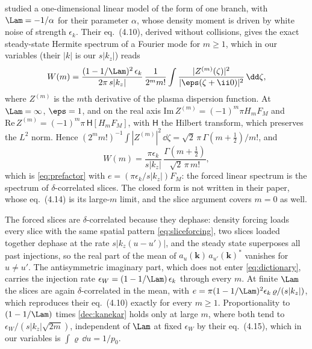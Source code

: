 \citet{Kanekar2015} studied a one-dimensional linear model of the form of one branch, with $\Lam=-1/\alpha$ for their parameter $\alpha$, whose density moment is driven by white noise of strength $\epsilon_k$. Their eq.~(4.10), derived without collisions, gives the exact steady-state Hermite spectrum of a Fourier mode for $m\ge1$, which in our variables (their $|k|$ is our $s|k_z|$) reads
\begin{equation*}
  W(m)=\frac{(1-1/\Lam)^2\,\epsilon_k}{2\pi\,s|k_z|}\,\frac{1}{2^mm!}\int\frac{|Z^{(m)}(\zeta)|^2}{|\eps(\zeta+\ii0)|^2}\,\dd\zeta ,
\end{equation*}
where $Z^{(m)}$ is the $m$th derivative of the plasma dispersion function. At $\Lam=\infty$, $\eps=1$, and on the real axis $\mathrm{Im}\,Z^{(m)}=(-1)^m\pi H_mF_M$ and $\mathrm{Re}\,Z^{(m)}=(-1)^m\pi\,\mathsf H[H_mF_M]$, with $\mathsf H$ the Hilbert transform, which preserves the $L^2$ norm. Hence $(2^mm!)^{-1}\int|Z^{(m)}|^2\,\dd\zeta=\sqrt2\,\pi\,\Gamma(m+\frac12)/m!$, and
\begin{equation}\label{dec:kanekar}
  W(m)=\frac{\pi\epsilon_k}{s|k_z|}\,\frac{\Gamma(m+\frac12)}{\sqrt2\,\pi\,m!} ,
\end{equation}
which is \eqref{eq:prefactor} with $e=(\pi\epsilon_k/s|k_z|)F_M$: the forced linear spectrum is the spectrum of $\delta$-correlated slices. The closed form is not written in their paper, whose eq.~(4.14) is its large-$m$ limit, and the slice argument covers $m=0$ as well.

The forced slices are $\delta$-correlated because they dephase: density forcing loads every slice with the same spatial pattern \eqref{eq:sliceforcing}, two slices loaded together dephase at the rate $s|k_z(u-u')|$, and the steady state superposes all past injections, so the real part of the mean of $a_u(\boldsymbol k)\,a_{u'}(\boldsymbol k)^*$ vanishes for $u\ne u'$. The antisymmetric imaginary part, which does not enter \eqref{eq:dictionary}, carries the injection rate $\epsilon_W=(1-1/\Lam)\,\epsilon_k$ through every $m$. At finite $\Lam$ the slices are again $\delta$-correlated in the mean, with $e=\pi(1-1/\Lam)^2\epsilon_k\,\varrho/(s|k_z|)$, which reproduces their eq.~(4.10) exactly for every $m\ge1$. Proportionality to $(1-1/\Lam)$ times \eqref{dec:kanekar} holds only at large $m$, where both tend to $\epsilon_W/(s|k_z|\sqrt{2m})$, independent of $\Lam$ at fixed $\epsilon_W$ by their eq.~(4.15), which in our variables is $\int\varrho\,\dd u=1/p_0$.

